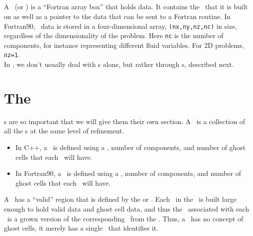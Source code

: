 \subsection{\FArrayBox}

A \FArrayBox\ (or \Fab) is a ``Fortran array box'' that holds data.  It contains the
\BoxType\ that it is built on as well as a pointer to the data 
that can be sent to a Fortran routine.
In Fortran90, \Fab\ data is stored in a four-dimensional array,
{\tt (nx,ny,nz,nc)} in size, regardless of the dimensionality of the
problem.  Here {\tt nc} is the number of components, for instance
representing different fluid variables.  For 2D problems, {\tt nz=1}.\\

In \BoxLib, we don't usually deal with 
\Fab s alone, but rather through \MultiFab s, described next.

\section{The \MultiFab}
\MultiFab s are so important that we will give them their own section.
A \MultiFab\ is a collection of all the \Fab s at the same level of
refinement.
\begin{itemize}
\item In C++, a \MultiFab\ is defined using a \BoxArray,
number of components, and number of ghost cells that each \Fab\
will have.
\item In Fortran90, a \MultiFab\ is defined using a \layout,
number of components, and number of ghost cells that each \Fab\
will have.
\end{itemize}
A \MultiFab\ has a ``valid'' region that is defined by 
the \BoxArray or \layout.  Each \Fab\ in the \MultiFab\ is built large enough 
to hold valid data and ghost cell data, and thus the \BoxType\ associated with
each \Fab\ is a grown version of the corresponding \BoxType\ from the \BoxArray.
Thus, a \Fab\ has no concept 
of ghost cells, it merely has a single \BoxType\ that identifies it.\\

